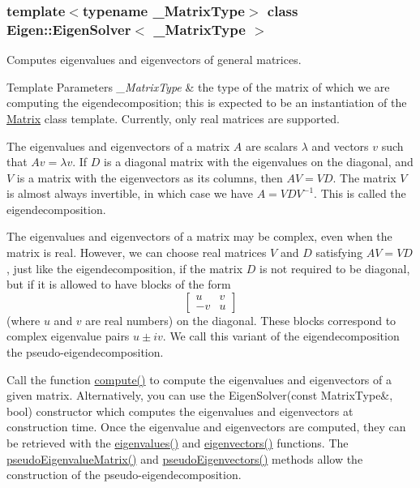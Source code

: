 \subsubsection*{template$<$typename \+\_\+\+Matrix\+Type$>$\newline
class Eigen\+::\+Eigen\+Solver$<$ \+\_\+\+Matrix\+Type $>$}

Computes eigenvalues and eigenvectors of general matrices. 


\begin{DoxyTemplParams}{Template Parameters}
{\em \+\_\+\+Matrix\+Type} & the type of the matrix of which we are computing the eigendecomposition; this is expected to be an instantiation of the \hyperlink{group___core___module_class_eigen_1_1_matrix}{Matrix} class template. Currently, only real matrices are supported.\\
\hline
\end{DoxyTemplParams}
The eigenvalues and eigenvectors of a matrix $ A $ are scalars $ \lambda $ and vectors $ v $ such that $ Av = \lambda v $. If $ D $ is a diagonal matrix with the eigenvalues on the diagonal, and $ V $ is a matrix with the eigenvectors as its columns, then $ A V = V D $. The matrix $ V $ is almost always invertible, in which case we have $ A = V D V^{-1} $. This is called the eigendecomposition.

The eigenvalues and eigenvectors of a matrix may be complex, even when the matrix is real. However, we can choose real matrices $ V $ and $ D $ satisfying $ A V = V D $, just like the eigendecomposition, if the matrix $ D $ is not required to be diagonal, but if it is allowed to have blocks of the form \[ \begin{bmatrix} u & v \\ -v & u \end{bmatrix} \] (where $ u $ and $ v $ are real numbers) on the diagonal. These blocks correspond to complex eigenvalue pairs $ u \pm iv $. We call this variant of the eigendecomposition the pseudo-\/eigendecomposition.

Call the function \hyperlink{group___eigenvalues___module_a38d032b75b3e75640e3db42e7ab20c24}{compute()} to compute the eigenvalues and eigenvectors of a given matrix. Alternatively, you can use the Eigen\+Solver(const Matrix\+Type\&, bool) constructor which computes the eigenvalues and eigenvectors at construction time. Once the eigenvalue and eigenvectors are computed, they can be retrieved with the \hyperlink{group___eigenvalues___module_a114189009e42f5e03372a7a3dfa33b97}{eigenvalues()} and \hyperlink{group___eigenvalues___module_a66288022802172e3ee059283b26201d7}{eigenvectors()} functions. The \hyperlink{group___eigenvalues___module_a4979eafe0aeef06b19ada7fa5e19db17}{pseudo\+Eigenvalue\+Matrix()} and \hyperlink{group___eigenvalues___module_a4e796226f06e1f7347cf03a38755a155}{pseudo\+Eigenvectors()} methods allow the construction of the pseudo-\/eigendecomposition.

